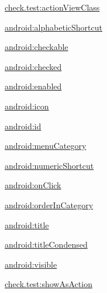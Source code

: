 {\ttfamily \hyperlink{classcheck_1_1test_1_1_r_1_1styleable_a66bbe255e93d07b1c2d98af7b85bcf37}{check.\+test\+:action\+View\+Class}}

{\ttfamily \hyperlink{classcheck_1_1test_1_1_r_1_1styleable_a787aabf6b90e6e64c272388b5702e917}{android\+:alphabetic\+Shortcut}}

{\ttfamily \hyperlink{classcheck_1_1test_1_1_r_1_1styleable_a805d9eb8afc5f5884886c1cfd76c506f}{android\+:checkable}}

{\ttfamily \hyperlink{classcheck_1_1test_1_1_r_1_1styleable_a70f7214872e00bf3172089cd9d463d88}{android\+:checked}}

{\ttfamily \hyperlink{classcheck_1_1test_1_1_r_1_1styleable_a51ca1e5adfffb26576e59bc1610f9c6e}{android\+:enabled}}

{\ttfamily \hyperlink{classcheck_1_1test_1_1_r_1_1styleable_aa78bee5f32455dafa0a089ab87130bc1}{android\+:icon}}

{\ttfamily \hyperlink{classcheck_1_1test_1_1_r_1_1styleable_a59b9e4a6fb4718026e0941ce96cbb5b6}{android\+:id}}

{\ttfamily \hyperlink{classcheck_1_1test_1_1_r_1_1styleable_a0fe0f490126cfec187176b2dd0855360}{android\+:menu\+Category}}

{\ttfamily \hyperlink{classcheck_1_1test_1_1_r_1_1styleable_ab191ae989550111a8c237ae16c0edddb}{android\+:numeric\+Shortcut}}

{\ttfamily \hyperlink{classcheck_1_1test_1_1_r_1_1styleable_ab293bb00a7a1be438c2631ec1b79c3cf}{android\+:on\+Click}}

{\ttfamily \hyperlink{classcheck_1_1test_1_1_r_1_1styleable_a65a13cc3cfb4d4146adc454569280de7}{android\+:order\+In\+Category}}

{\ttfamily \hyperlink{classcheck_1_1test_1_1_r_1_1styleable_a156b50bbe0771f25d5dab6d62c313320}{android\+:title}}

{\ttfamily \hyperlink{classcheck_1_1test_1_1_r_1_1styleable_a789a23064482ca589c0b3d8f0a0adaae}{android\+:title\+Condensed}}

{\ttfamily \hyperlink{classcheck_1_1test_1_1_r_1_1styleable_a1c79d64eac1e675e15e462194f67b098}{android\+:visible}}

{\ttfamily \hyperlink{classcheck_1_1test_1_1_r_1_1styleable_aa76aaf06f02ab88d86f636df6aa194a3}{check.\+test\+:show\+As\+Action}}

